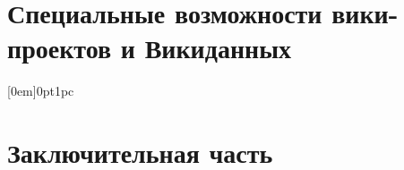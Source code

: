 \documentclass[nofonts,justified,nobib,openany]{tufte-book}%
\newcounter{draft}
\theoremstyle{definition}
\begin{document}
\iffalse








\ifnumequal{\value{draft}}{1}{%
  
  
}









\fi

\part{Специальные возможности вики-проектов и Викиданных}
\label{part:advanced}




[0em]{\sffamily\bfseries\large\protect\addvspace{15pt}}{0pt}{1pc}
\part*{Заключительная часть}
\label{part:conclusion}



\backmatter


\begin{fullwidth}
{}
\listoffigures

{}
\listoftables

\newrefcontext[sorting=ntvy]
\printbibliography[env=gostbibliography]

%
%
\end{fullwidth}

\printindex
\end{document}
